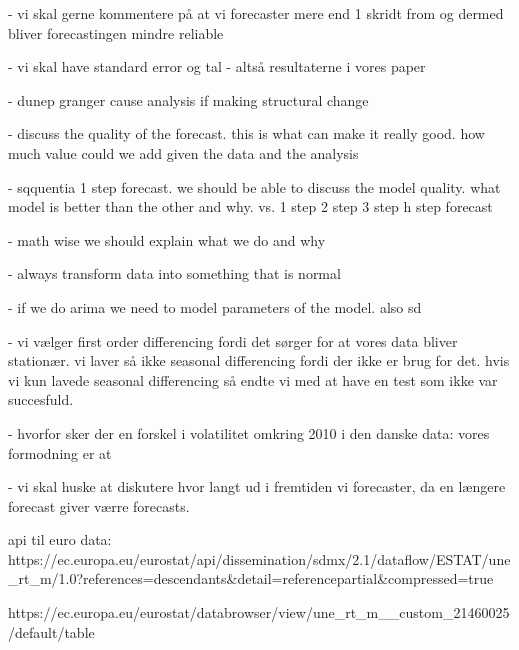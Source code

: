 - vi skal gerne kommentere på at vi forecaster mere end 1 skridt from og dermed bliver forecastingen mindre reliable

- vi skal have standard error og tal - altså resultaterne i vores paper

- dunep granger cause analysis if making structural change

- discuss the quality of the forecast. this is what can make it really good. how much value could we add given the data and the analysis

- sqquentia 1 step forecast. we should be able to discuss the model quality. what model is better than the other and why. vs. 1 step 2 step 3 step h step forecast

- math wise we should explain what we do and why

- always transform data into something that is normal

- if we do arima we need to model parameters of the model. also sd


- vi vælger first order differencing fordi det sørger for at vores data bliver stationær. vi laver så ikke seasonal differencing fordi der ikke er brug for det. hvis vi kun lavede seasonal differencing så endte vi med at have en test som ikke var succesfuld. 

- hvorfor sker der en forskel i volatilitet omkring 2010 i den danske data: vores formodning er at 

- vi skal huske at diskutere hvor langt ud i fremtiden vi forecaster, da en længere forecast giver værre forecasts.

api til euro data: https://ec.europa.eu/eurostat/api/dissemination/sdmx/2.1/dataflow/ESTAT/une_rt_m/1.0?references=descendants&detail=referencepartial&compressed=true

https://ec.europa.eu/eurostat/databrowser/view/une_rt_m__custom_21460025/default/table